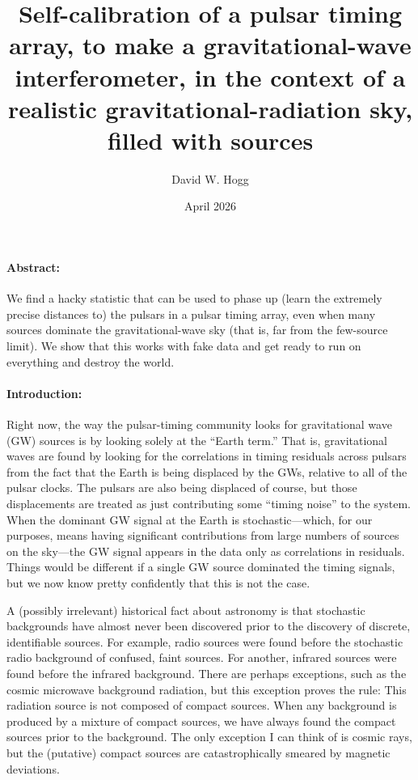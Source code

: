\documentclass{article}
\title{\bfseries
Self-calibration of a pulsar timing array, to make a gravitational-wave interferometer, in the context of a realistic gravitational-radiation sky, filled with sources}
\author{David W. Hogg}
\date{April 2026}
\begin{document}
\maketitle

\paragraph{Abstract:}
We find a hacky statistic that can be used to phase up (learn the extremely precise distances to) the pulsars in a pulsar timing array, even when many sources dominate the gravitational-wave sky (that is, far from the few-source limit).
We show that this works with fake data and get ready to run on everything and destroy the world.

\paragraph{Introduction:}
Right now, the way the pulsar-timing community looks for gravitational wave (GW) sources is by looking solely at the ``Earth term.''
That is, gravitational waves are found by looking for the correlations in timing residuals across pulsars from the fact that the Earth is being displaced by the GWs, relative to all of the pulsar clocks.
The pulsars are also being displaced of course, but those displacements are treated as just contributing some ``timing noise'' to the system.
When the dominant GW signal at the Earth is stochastic---which, for our purposes, means having significant contributions from large numbers of sources on the sky---the GW signal appears in the data only as correlations in residuals.
Things would be different if a single GW source dominated the timing signals, but we now know pretty confidently that this is not the case.

A (possibly irrelevant) historical fact about astronomy is that stochastic backgrounds have almost never been discovered prior to the discovery of discrete, identifiable sources.
For example, radio sources were found before the stochastic radio background of confused, faint sources.
For another, infrared sources were found before the infrared background.
There are perhaps exceptions, such as the cosmic microwave background radiation, but this exception proves the rule:
This radiation source is not composed of compact sources.
When any background is produced by a mixture of compact sources, we have always found the compact sources prior to the background.
The only exception I can think of is cosmic rays, but the (putative) compact sources are catastrophically smeared by magnetic deviations.
\end{document}
